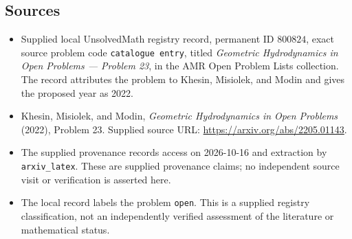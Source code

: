 \documentclass[11pt]{article}
\begin{document}
\subsection{Sources}
\begin{itemize}
\item Supplied local UnsolvedMath registry record, permanent ID \(800824\), exact source problem code \texttt{catalogue entry}, titled \emph{Geometric Hydrodynamics in Open Problems --- Problem 23}, in the AMR Open Problem Lists collection. The record attributes the problem to Khesin, Misiolek, and Modin and gives the proposed year as 2022.
\item Khesin, Misiolek, and Modin, \emph{Geometric Hydrodynamics in Open Problems} (2022), Problem 23. Supplied source URL: \url{https://arxiv.org/abs/2205.01143}.
\item The supplied provenance records access on 2026-10-16 and extraction by \texttt{arxiv\_latex}. These are supplied provenance claims; no independent source visit or verification is asserted here.
\item The local record labels the problem \texttt{open}. This is a supplied registry classification, not an independently verified assessment of the literature or mathematical status.
\end{itemize}
\end{document}
